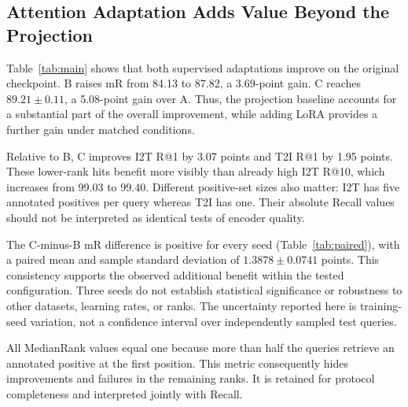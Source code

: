 \documentclass[conference]{IEEEtran}
\begin{document}
\begin{table}[t]
\caption{Final test retrieval. Recall and mR are percentages. B/C report means $\pm$ sample standard deviations across three training seeds. A is evaluated once without adaptation. MedianRank is 1 for every reported run.}
\label{tab:main}
\centering
\footnotesize
\setlength{\tabcolsep}{3pt}

\end{table}

\subsection{Attention Adaptation Adds Value Beyond the Projection}
Table~\ref{tab:main} shows that both supervised adaptations improve on the original checkpoint. B raises mR from 84.13 to 87.82, a 3.69-point gain. C reaches $89.21\pm0.11$, a 5.08-point gain over A. Thus, the projection baseline accounts for a substantial part of the overall improvement, while adding LoRA provides a further gain under matched conditions.

Relative to B, C improves I2T R@1 by 3.07 points and T2I R@1 by 1.95 points. These lower-rank hits benefit more visibly than already high I2T R@10, which increases from 99.03 to 99.40. Different positive-set sizes also matter: I2T has five annotated positives per query whereas T2I has one. Their absolute Recall values should not be interpreted as identical tests of encoder quality.

\begin{table}[t]
\caption{Paired final-test mR by training seed. Differences are percentage points. All selected epochs are five.}
\label{tab:paired}
\centering

\end{table}

The C-minus-B mR difference is positive for every seed (Table~\ref{tab:paired}), with a paired mean and sample standard deviation of $1.3878\pm0.0741$ points. This consistency supports the observed additional benefit within the tested configuration. Three seeds do not establish statistical significance or robustness to other datasets, learning rates, or ranks. The uncertainty reported here is training-seed variation, not a confidence interval over independently sampled test queries.

All MedianRank values equal one because more than half the queries retrieve an annotated positive at the first position. This metric consequently hides improvements and failures in the remaining ranks. It is retained for protocol completeness and interpreted jointly with Recall.
\end{document}
